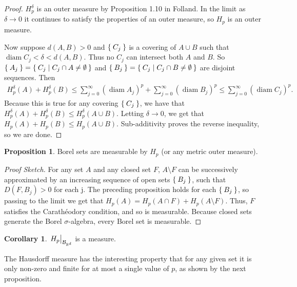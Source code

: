 \documentclass[11pt]{amsart}
\theoremstyle{definition}
\newtheorem{prop}[definition]{Proposition}
\newtheorem{cor}[definition]{Corollary}
\newcommand{\R}{\ensuremath{\mathbb{R}}}
\newcommand{\B}{\ensuremath{\mathcal{B}}}
\DeclareMathOperator{\diam}{diam}
\begin{document}
\begin{proof}
	\(H_p^\delta\) is an outer measure by Proposition 1.10 in Folland. In the limit as \( \delta \rightarrow 0 \) it continues to satisfy the properties of an outer measure, so \( H_p \) is an outer measure. 
	
	Now suppose \( d(A, B) > 0\) and \( \Set{C_j} \) is a covering of \( A \cup B \) such that \(\diam C_j < \delta < d(A, B) \). Thus no \( C_j \) can intersect both \(A\) and \(B\). So \( \Set{A_j} = \Set{C_j | C_j \cap A \neq \emptyset } \) and \( \Set{B_j} = \Set{C_j | C_j \cap B \neq \emptyset } \) are disjoint sequences. Then 
	\begin{align}
		H_p^\delta(A) + H_p^\delta(B) 
		\leq \sum_{j = 0}^\infty (\diam A_j)^p + \sum_{j = 0}^\infty (\diam B_j)^p
		\leq \sum_{j = 0}^\infty (\diam C_j)^p .
	\end{align}
	Because this is true for any covering \( \Set{C_j} \), we have that \(H_p^\delta(A) + H_p^\delta(B) \leq H_p^\delta(A \cup B) \). Letting \( \delta \rightarrow 0 \), we get that \( H_p(A) + H_p(B) \leq H_p(A \cup B) \). Sub-additivity proves the reverse inequality, so we are done.
\end{proof}

\begin{prop}\label{prop:borels}
	Borel sets are measurable by \( H_p\) (or any metric outer measure).
\end{prop}

\begin{proof}[Proof Sketch]
	For any set \(A\) and any closed set \(F\), \(A \setminus F\) can be successively approximated by an increasing sequence of open sets \( \Set{B_j} \), such that \( D(F, B_j) > 0 \) for each j.
	The preceding proposition holds for each \(\Set{B_j}\), so passing to the limit we get that \( H_p(A) = H_p(A \cap F) + H_p(A \setminus F) \). Thus, \( F \) satisfies the Carathéodory condition, and so is measurable. 
	Because closed sets generate the Borel \(\sigma\)-algebra, every Borel set is measurable. 
\end{proof}

\begin{cor}\label{prop:borels:cor}
	\( \left. \vphantom{\big|} H_p \right|_ {\B_{\R^d}}\) is a measure. 
\end{cor}

The Hausdorff measure has the interesting property that for any given set it is only non-zero and finite for at most a single value of \(p\), as shown by the next proposition.
\end{document}
